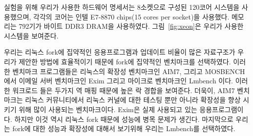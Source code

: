 실험을 위해 우리가 사용한 하드웨어 명세서는 8소켓으로 구성된 120코어 시스템을 사용했으며,
각각의 코어는 인텔 E7-8870 chips(15 cores per socket)을 사용했다.
메모리는 792기가 바이트 DDR3 DRAM을 사용하였다.
그림~\ref{fig:xeon}은 우리가 사용한 시스템을 보여준다.



우리는 리눅스 fork에 집약적인 응용프로그램과 업데이트 비율이 많은 자료구조가 우리가 
제안한 방법에 효율적이기 때문에 fork에 집약적인 벤치마크를 선택하였다. 
이러한 벤치마크 프로그램들은 리눅스의 확장성 벤치마크인 AIM7, 그리고 MOSBENCH에서
 이메일 서버 벤치마크인 Exim 그리고 마이크로 벤치마크인 Lmbench 이다.
이러한 워크로드 들은 두가지 역 매핑 때문에 높은 락 경합을 보여준다. 
더욱이, AIM7 벤치마크는 리눅스 커뮤니티에서 리눅스 커널에 대한 테스팅 뿐만 아니라 확장성을 향상 
시키기 위해 많이 사용되는 벤치마크이다.
Exim은 실제 사용되고 있는 응용프로그램이다. 하지만 이것 역시 리눅스 fork 때문에 
성능에 병목 문제가 생긴다.
마지막으로 우리는 fork에 대한 성능과 확장성에 대해서 보기위해 우리는 Lmbench를 
선택하였다. 

